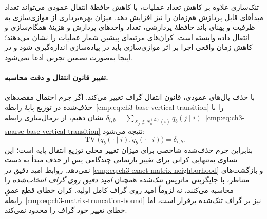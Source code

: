 تنک‌سازی علاوه بر کاهش تعداد
عملیات، با کاهش حافظهٔ انتقال
عمودی می‌تواند تعداد مبدأهای
قابل پردازش هم‌زمان را نیز
افزایش دهد. میزان بهره‌برداری
از موازی‌سازی به ظرفیت و
پهنای باند حافظهٔ پردازشی،
تعداد واحدهای پردازش و هزینهٔ
همگام‌سازی و انتقال داده
وابسته است. کران‌های مرتبه‌ای
پیشین شمار عملیات را نشان
می‌دهند؛ کاهش زمان واقعی اجرا
بر اثر موازی‌سازی باید در
پیاده‌سازی اندازه‌گیری شود
و در اینجا به‌صورت تضمین
تجربی ادعا نمی‌شود.

\paragraph{تغییر قانون انتقال و دقت محاسبه.}
با حذف یال‌های عمودی، قانون
انتقال گراف تغییر می‌کند.
اگر جرم احتمال مقصدهای
حذف‌شده در توزیع پایهٔ
رابطه~\eqref{cmp:eq:ch3-base-vertical-transition}
را با
$\delta_{i,b}=
\sum_{X_j\notin N_b^{(\Delta)}(i)}
q_b(j\mid i)$
نشان دهیم، از نرمال‌سازی
رابطه~\eqref{cmp:eq:ch3-sparse-base-vertical-transition}
نتیجه می‌شود:
\begin{equation}\label{cmp:eq:ch3-sparse-removed-mass}
\boxed{
\operatorname{TV}\bigl(
q_b(\cdot\mid i),
\widetilde q_b(\cdot\mid i)
\bigr)=\delta_{i,b}.
}
\end{equation}
بنابراین جرم حذف‌شده شاخصی
برای میزان تغییر محلی
توزیع انتقال پایه است؛
این تساوی به‌تنهایی کرانی
برای تغییر بازنمایی
چندگامی پس از حذف مبدأ
به دست نمی‌دهد.
روابط امید دقیق در
\eqref{cmp:eq:ch3-exact-matrix-neighborhood}
و بازگشت‌های متناظر، با
جایگزینی ماتریس تنک‌شده
همچنان \emph{امید دقیق روی
گراف انتخاب‌شده} را محاسبه
می‌کنند، نه لزوماً امید
روی گراف کامل اولیه.
کران خطای قطع عمقِ
رابطه~\eqref{cmp:eq:ch3-matrix-truncation-bound}
نیز بر گراف تنک‌شده
برقرار است، اما خطای
تغییر خود گراف را
محدود نمی‌کند.

